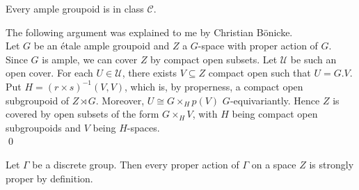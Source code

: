 \begin{prop}
Every ample groupoid is in class $\mathcal C$.
\end{prop}

\begin{dem} The following argument was explained to me by Christian Bönicke.\\ 
Let $G$ be an étale ample groupoid and $Z$ a $G$-space with proper action of $G$. Since $G$ is ample, we can cover $Z$ by compact open subsets. Let $\mathcal U$ be such an open cover. For each $U\in \mathcal U$, there exists $V\subseteq Z$ compact open such that $U= G.V$. Put $H= (r\times s)^{-1}(V,V)$, which is, by properness, a compact open subgroupoid of $Z\rtimes G$. Moreover, $U\cong G\times_H p(V)$ $G$-equivariantly. Hence $Z$ is covered by open subsets of the form $G\times_H V$, with $H$ being compact open subgroupoids and $V$ being $H$-spaces.\\ 
\qed
\end{dem}

\begin{rk}
Let $\Gamma$ be a discrete group. Then every proper action of $\Gamma$ on a space $Z$ is strongly proper by definition.
\end{rk}









